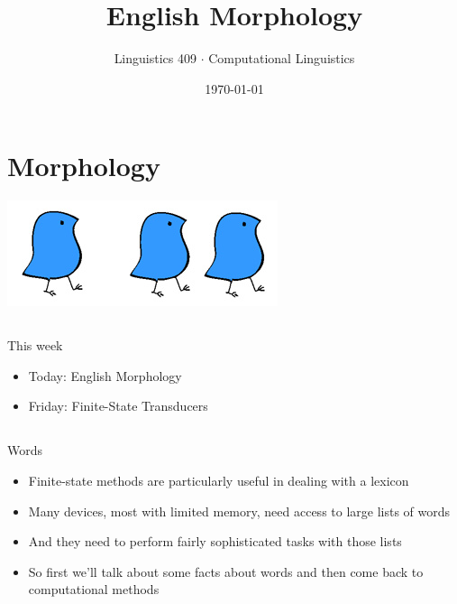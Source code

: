 \documentclass[9pt,xcolor=pdftex,dvipsnames,table]{beamer}
\title{English Morphology}
\subtitle{}
\author{Linguistics 409 $\cdot$ Computational Linguistics}
\institute{Rice University}
\date[]{{\small \today}}
\begin{document}

\section{Morphology}

\begin{frame}

	\titlepage
	\begin{center}
		\includegraphics[width=.5\paperwidth]{wugs.jpg}	
	\end{center}
\end{frame}

\subsection{}
\begin{frame}{This week}

	\begin{itemize}
		\item Today: English Morphology
		\item Friday: Finite-State Transducers
	\end{itemize}
\end{frame}

\subsection{}
\begin{frame}{Words}
	\begin{itemize}
		\item Finite-state methods are particularly useful in dealing with a lexicon
		\item Many devices, most with limited memory, need access to large lists of words
		\item And they need to perform fairly sophisticated tasks with those lists
		\item So first we'll talk about some facts about words and then come back to computational methods
	\end{itemize}
\end{frame}
\end{document}
